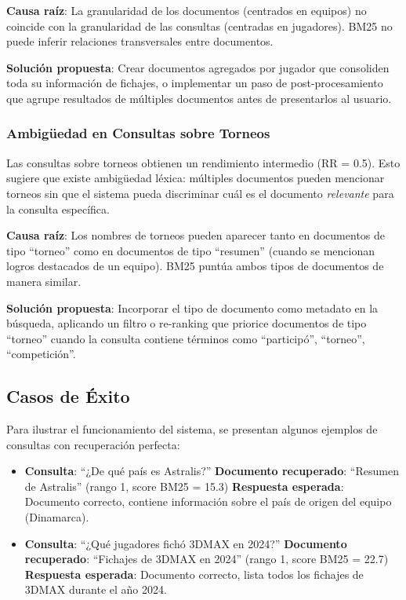 \textbf{Causa raíz}: La granularidad de los documentos (centrados en equipos) no coincide con la granularidad de las consultas (centradas en jugadores). BM25 no puede inferir relaciones transversales entre documentos.

\textbf{Solución propuesta}: Crear documentos agregados por jugador que consoliden toda su información de fichajes, o implementar un paso de post-procesamiento que agrupe resultados de múltiples documentos antes de presentarlos al usuario.

\subsubsection{Ambigüedad en Consultas sobre Torneos}

Las consultas sobre torneos obtienen un rendimiento intermedio (RR = 0.5). Esto sugiere que existe ambigüedad léxica: múltiples documentos pueden mencionar torneos sin que el sistema pueda discriminar cuál es el documento \textit{relevante} para la consulta específica.

\textbf{Causa raíz}: Los nombres de torneos pueden aparecer tanto en documentos de tipo ``torneo'' como en documentos de tipo ``resumen'' (cuando se mencionan logros destacados de un equipo). BM25 puntúa ambos tipos de documentos de manera similar.

\textbf{Solución propuesta}: Incorporar el tipo de documento como metadato en la búsqueda, aplicando un filtro o re-ranking que priorice documentos de tipo ``torneo'' cuando la consulta contiene términos como ``participó'', ``torneo'', ``competición''.

\subsection{Casos de Éxito}

Para ilustrar el funcionamiento del sistema, se presentan algunos ejemplos de consultas con recuperación perfecta:

\begin{itemize}
    \item \textbf{Consulta}: ``¿De qué país es Astralis?''  
    \textbf{Documento recuperado}: ``Resumen de Astralis'' (rango 1, score BM25 = 15.3)  
    \textbf{Respuesta esperada}: Documento correcto, contiene información sobre el país de origen del equipo (Dinamarca).
    
    \item \textbf{Consulta}: ``¿Qué jugadores fichó 3DMAX en 2024?''  
    \textbf{Documento recuperado}: ``Fichajes de 3DMAX en 2024'' (rango 1, score BM25 = 22.7)  
    \textbf{Respuesta esperada}: Documento correcto, lista todos los fichajes de 3DMAX durante el año 2024.
\end{itemize}

